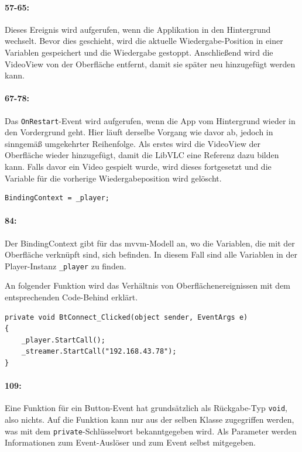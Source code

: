 \paragraph{57-65:} Dieses Ereignis wird aufgerufen, wenn die Applikation in den Hintergrund wechselt.
Bevor dies geschieht, wird die aktuelle Wiedergabe-Position in einer Variablen gespeichert und die Wiedergabe gestoppt.
Anschließend wird die VideoView von der Oberfläche entfernt, damit sie später neu hinzugefügt werden kann.
\paragraph{67-78:} Das \texttt{OnRestart}-Event wird aufgerufen, wenn die App vom Hintergrund wieder in den Vordergrund geht.
Hier läuft derselbe Vorgang wie davor ab, jedoch in sinngemäß umgekehrter Reihenfolge.
Als erstes wird die VideoView der Oberfläche wieder hinzugefügt, damit die LibVLC eine Referenz dazu bilden kann.
Falls davor ein Video gespielt wurde, wird dieses fortgesetzt und die Variable für die vorherige Wiedergabeposition wird gelöscht.

\begin{verbatim}
BindingContext = _player;
\end{verbatim}
\paragraph{84:} Der BindingContext gibt für das \ac{mvvm}-Modell an, wo die Variablen, die mit der Oberfläche verknüpft sind, sich befinden.
In diesem Fall sind alle Variablen in der Player-Instanz \texttt{\_player} zu finden.

An folgender Funktion wird das Verhältnis von Oberflächenereignissen mit dem entsprechenden Code-Behind erklärt.
\begin{verbatim}
private void BtConnect_Clicked(object sender, EventArgs e)
{
    _player.StartCall();
    _streamer.StartCall("192.168.43.78");
}
\end{verbatim}
\paragraph{109:} Eine Funktion für ein Button-Event hat grundsätzlich als Rückgabe-Typ \texttt{void}, also nichts.
Auf die Funktion kann nur aus der selben Klasse zugegriffen werden, was mit dem \texttt{private}-Schlüsselwort bekanntgegeben wird.
Als Parameter werden Informationen zum Event-Auslöser und zum Event selbst mitgegeben.
